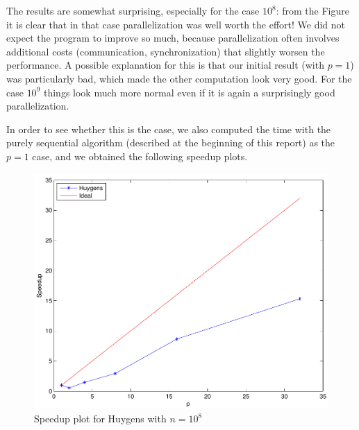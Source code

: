 \documentclass[a4paper,11pt]{article}
\begin{document}
The results are somewhat surprising, especially for the case $10^8$: from the Figure it is clear that in that case parallelization was well worth the effort! We did not expect the program to improve so much, because parallelization often involves additional costs (communication, synchronization) that slightly worsen the performance. A possible explanation for this is that our initial result (with $p=1$) was particularly bad, which made the other computation look very good. For the case $10^9$ things look much more normal even if it is again a surprisingly good parallelization.

In order to see whether this is the case, we also computed the time with the purely sequential algorithm (described at the beginning of this report) as the $p=1$ case, and we obtained the following speedup plots.

\begin{figure}[H]
\begin{center}
\includegraphics[scale=0.6]{img/sp1e8-2}
\end{center}
\caption{Speedup plot for Huygens with $n=10^8$} \label{mb:2}
\end{figure}
\end{document}
